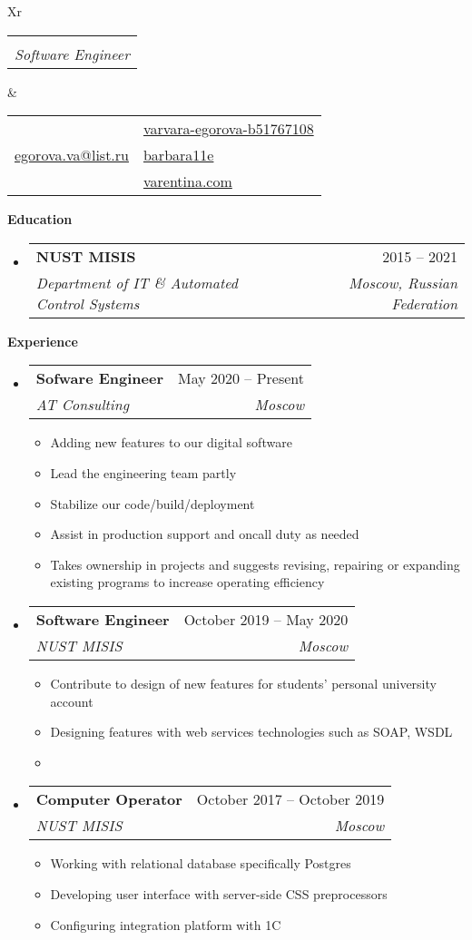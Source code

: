 \documentclass[letterpaper,12pt]{article}[leftmargin=*]
\makeatletter
\def \fullname {Egorova Varvara}
\def \subtitle {Software Engineer}
\def \linkedinicon {\faLinkedin}
\def \linkedinlink {https://www.linkedin.com/in/varvara-egorova-b51767108/}
\def \linkedintext {varvara-egorova-b51767108}
\def \phoneicon {\faPhone}
\def \phonetext {+7(985) 543 20 98}
\def \emailicon {\faEnvelope}
\def \emaillink {mailto:egorova.va@list.ru}
\def \emailtext {egorova.va@list.ru}
\def \githubicon {\faGithub}
\def \githublink {https://github.com/barbara11e}
\def \githubtext {barbara11e}
\def \websiteicon {\faGlobe}
\def \websitelink {https://google.com/}
\def \websitetext {varentina.com}
\def \headertype {\doublecol} %
\def \entryspacing {-0pt}
\def \linkedin {\linkedinicon \hspace{3pt}\href{\linkedinlink}{\linkedintext}}
\def \phone {\phoneicon \hspace{3pt}{ \phonetext}}
\def \email {\emailicon \hspace{3pt}\href{\emaillink}{\emailtext}}
\def \github {\githubicon \hspace{3pt}\href{\githublink}{\githubtext}}
\def \website {\websiteicon \hspace{3pt}\href{\websitelink}{\websitetext}}
\renewcommand{\section}[2]{\vspace{5pt}
  \colorbox{secondary}{\color{white}\raggedbottom\normalsize\textbf{{#1}{\hspace{7pt}#2}}}
}
\newcommand{\resumeEntryStart}{\begin{itemize}[leftmargin=2.5mm]}
\newcommand{\resumeEntryEnd}{\end{itemize}\vspace{\entryspacing}}
\newcommand{\resumeItemListStart}{\begin{itemize}[leftmargin=4.5mm]}
\newcommand{\resumeItemListEnd}{\end{itemize}}
\newcommand{\resumeItem}[1]{
  \item\small{
    {#1 \vspace{-2pt}}
  }
}
\newcommand{\resumeEntryTSDL}[4]{
  \vspace{-1pt}\item[]
    \begin{tabularx}{0.97\textwidth}{X@{\hspace{60pt}}r}
      \textbf{\color{primary}#1} & {\firabook\color{accent}\small#2} \\
      \textit{\color{accent}\small#3} & \textit{\color{accent}\small#4} \\
    \end{tabularx}\vspace{-6pt}
}
\newcommand{\doublecol}[6]{
  \begin{tabularx}{\textwidth}{Xr}
    {
      \begin{tabular}[c]{l}
        \fontsize{35}{45}\selectfont{\color{primary}{{\textbf{\fullname}}}} \\
        {\textit{\subtitle}} %
      \end{tabular}
    } & {
      \begin{tabular}[c]{l@{\hspace{1.5em}}l}
        {\small#4} & {\small#1} \\
        {\small#5} & {\small#2} \\
        {\small#6} & {\small#3}
      \end{tabular}
    }
  \end{tabularx}
}
\newcommand{\singlecol}[6]{
  \begin{tabularx}{\textwidth}{Xr}
    {
      \begin{tabular}[b]{l}
        \fontsize{35}{45}\selectfont{\color{primary}{{\textbf{\fullname}}}} \\
        {\textit{\subtitle}} %
      \end{tabular}
    } & {
      \begin{tabular}[c]{l}
        {\small#1} \\
        {\small#2} \\
        {\small#3} \\
        {\small#4} \\
        {\small#5} \\
        {\small#6}
      \end{tabular}
    }
  \end{tabularx}
}
\makeatother
\begin{document}


\headertype{\linkedin}{\github}{\website}{\phone}{\email}{} %
\vspace{-10pt} %

\section{\faGraduationCap}{Education}

  \resumeEntryStart
    \resumeEntryTSDL
      {NUST MISIS}{2015 -- 2021}
      {Department of IT \& Automated Control Systems}{Moscow, Russian Federation}
  \resumeEntryEnd

\section{\faPieChart}{Experience}

  \resumeEntryStart
    \resumeEntryTSDL
      {Sofware Engineer}{May 2020 -- Present}
      {AT Consulting}{Moscow}
    \resumeItemListStart
      \resumeItem {Adding new features to our digital software}
      \resumeItem {Lead the engineering team partly}
      \resumeItem {Stabilize our code/build/deployment}
      \resumeItem {Assist in production support and oncall duty as needed}
      \resumeItem {Takes ownership in projects and suggests revising, repairing or expanding existing programs to increase operating efficiency}
    \resumeItemListEnd
  \resumeEntryEnd

  \resumeEntryStart
    \resumeEntryTSDL
      {Software Engineer}{October 2019 -- May 2020}
      {NUST MISIS}{Moscow}
    \resumeItemListStart
      \resumeItem {Contribute to design of new features for students' personal university account}
      \resumeItem {Designing features with web services technologies such as SOAP, WSDL}
      \resumeItem {}
    \resumeItemListEnd
  \resumeEntryEnd

  \resumeEntryStart
    \resumeEntryTSDL
      {Computer Operator}{October 2017 -- October 2019}
      {NUST MISIS}{Moscow}
    \resumeItemListStart
        \resumeItem {Working with relational database specifically Postgres}
        \resumeItem {Developing user interface with server-side CSS preprocessors}
        \resumeItem {Configuring integration platform with 1C}
    \resumeItemListEnd
  \resumeEntryEnd
\end{document}
